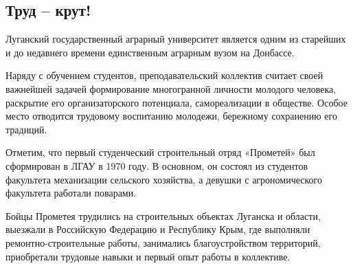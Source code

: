 
 
 
 
 
\subsection{Труд – крут!}
\label{sec:02_12_2021.stz.edu.lnr.lgau.1.trud_krut}




Луганский государственный аграрный университет является одним из старейших и до
недавнего времени единственным аграрным вузом на Донбассе.

Наряду с обучением студентов, преподавательский коллектив считает своей
важнейшей задачей формирование многогранной личности молодого человека,
раскрытие его организаторского потенциала, самореализации в обществе. Особое
место отводится трудовому воспитанию молодежи, бережному сохранению его
традиций.

Отметим, что первый студенческий строительный отряд «Прометей» был сформирован
в ЛГАУ в 1970 году. В основном, он состоял из студентов факультета механизации
сельского хозяйства, а девушки с агрономического факультета работали поварами.

Бойцы Прометея трудились на строительных объектах Луганска и области, выезжали
в Российскую Федерацию и Республику Крым, где выполняли ремонтно-строительные
работы, занимались благоустройством территорий, приобретали трудовые навыки и
первый опыт работы в коллективе.


